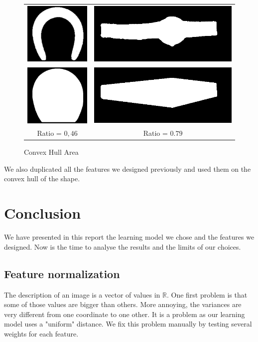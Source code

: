 \documentclass[a4paper, 11pt]{article}
\begin{document}
\begin{figure}[h!]
\centering
\begin{tabular}{c@{~}c}
\includegraphics[height=3cm]{horseshoe.png} &
\includegraphics[height=3cm]{watch.png} \\
\includegraphics[height=3cm]{horseshoe-convex.png} &
\includegraphics[height=3cm]{watch-convex.png} \\
Ratio = $0,46$ & Ratio = $0.79$
\end{tabular}
\caption{Convex Hull Area}
\end{figure}

 We also duplicated all the features we designed previously and used them on the convex hull of the shape.

\newpage
\section{Conclusion}

We have presented in this report the learning model we chose and the features we designed. Now is the time to analyse the results and the limits of our choices.

\subsection{Feature normalization}
The description of an image is a vector of values in $\mathbb R$. One first problem is that some of those values are bigger than others. More annoying, the variances are very different from one coordinate to one other. It is a problem as our learning model uses a "uniform" distance. We fix this problem manually by testing several weights for each feature.
\end{document}

